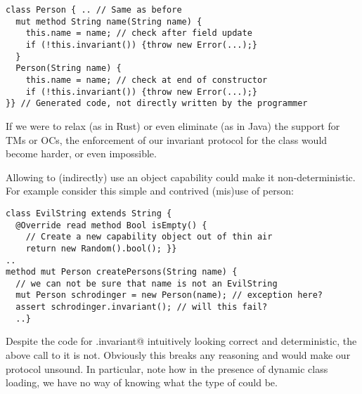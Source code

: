 
\begin{lstlisting}
class Person { .. // Same as before
  mut method String name(String name) {
    this.name = name; // check after field update
    if (!this.invariant()) {throw new Error(...);} 
  }
  Person(String name) {
    this.name = name; // check at end of constructor
    if (!this.invariant()) {throw new Error(...);}
}} // Generated code, not directly written by the programmer
\end{lstlisting}


\noindent If we were to relax (as in Rust) or even eliminate (as in Java) the support for TMs or OCs, the enforcement of our invariant protocol for the \Q@Person@ class would become harder, or even impossible. 

Allowing \Q@invariant@ to (indirectly) use an object capability could make it non-deterministic. For example consider this simple and contrived (mis)use of person:
\begin{lstlisting}[morekeywords={assert}]
class EvilString extends String {
  @Override read method Bool isEmpty() {
    // Create a new capability object out of thin air
    return new Random().bool(); }}
..
method mut Person createPersons(String name) {
  // we can not be sure that name is not an EvilString
  mut Person schrodinger = new Person(name); // exception here?
  assert schrodinger.invariant(); // will this fail?
  ..}
\end{lstlisting}
Despite the code for \Q@Person.invariant@ intuitively looking correct and deterministic, the above call to it is not. Obviously this breaks any reasoning and would make our protocol unsound. 
In particular, note how in the presence of dynamic class loading, we have no way of knowing what the type of \Q@name@ could be.

